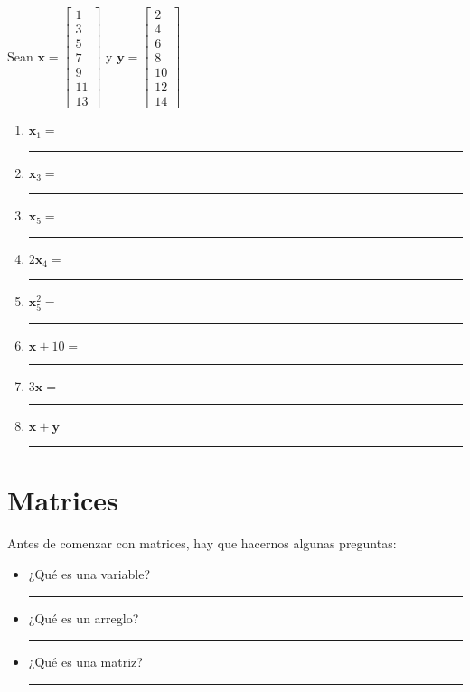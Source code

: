 \documentclass[spanish, 10pt]{article}
\newcommand{\shortresponserule}{{\large\rule{5 cm}{0.3mm}}}
\begin{document}
\begin{multicols}{2}
Sean $\mathbf{x} = \begin{bmatrix} 1\\ 3\\ 5\\ 7\\ 9\\ 11\\ 13 \end{bmatrix}$ \quad y \quad $\mathbf{y} = \begin{bmatrix}
    2 \\ 4 \\ 6 \\ 8 \\ 10 \\ 12 \\ 14
\end{bmatrix}$
    \columnbreak
    \begin{enumerate}
        \itemsep2.5ex
        \item $\mathbf{x}_1 =$ \hfill \shortresponserule
        \item $\mathbf{x}_3 =$ \hfill \shortresponserule
        \item $\mathbf{x}_5 =$ \hfill \shortresponserule
        \item $2\mathbf{x}_4 =$ \hfill \shortresponserule
        \item $\mathbf{x}_5^2 =$ \hfill \shortresponserule
        \item $\mathbf{x} + 10 =$ \hfill \shortresponserule
        \item $3 \mathbf{x} =$ \hfill \shortresponserule
        \item $\mathbf{x} + \mathbf{y}$ \hfill \shortresponserule
    \end{enumerate}
\end{multicols}

\section{Matrices}

Antes de comenzar con matrices, hay que hacernos algunas preguntas:

\begin{itemize}
    \item ¿Qué es una variable? \hfill \shortresponserule
    \item ¿Qué es un arreglo? \hfill \shortresponserule
	\item ¿Qué es una matriz? \hfill \shortresponserule
\end{itemize}
\end{document}
